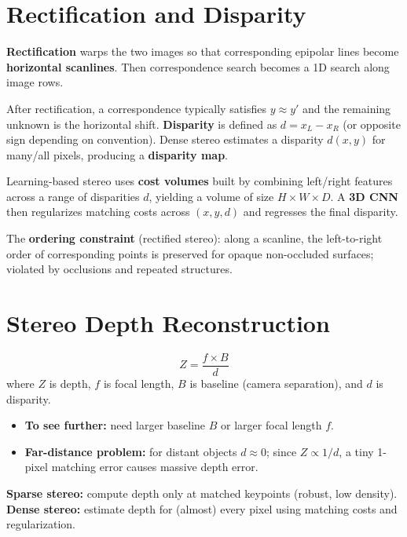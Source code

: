 \documentclass[11pt, oneside]{book}
\begin{document}
\section{Rectification and Disparity}

\begin{defbox}[title={Rectification}]
\textbf{Rectification} warps the two images so that corresponding epipolar lines become \textbf{horizontal scanlines}.
Then correspondence search becomes a 1D search along image rows.
\end{defbox}

After rectification, a correspondence typically satisfies $y \approx y'$ and the remaining unknown is the horizontal shift.
\textbf{Disparity} is defined as $d = x_L - x_R$ (or opposite sign depending on convention).
Dense stereo estimates a disparity $d(x,y)$ for many/all pixels, producing a \textbf{disparity map}.

Learning-based stereo uses \textbf{cost volumes} built by combining left/right features across a range of disparities $d$,
yielding a volume of size $H\times W\times D$. A \textbf{3D CNN} then regularizes matching costs across $(x,y,d)$
and regresses the final disparity.

The \textbf{ordering constraint} (rectified stereo): along a scanline, the left-to-right order of corresponding points
is preserved for opaque non-occluded surfaces; violated by occlusions and repeated structures.

\section{Stereo Depth Reconstruction}

\begin{thmbox}[title={The Classic Stereo Formula}]
\[
Z = \frac{f \times B}{d}
\]
where $Z$ is depth, $f$ is focal length, $B$ is baseline (camera separation), and $d$ is disparity.
\begin{itemize}
  \item \textbf{To see further:} need larger baseline $B$ or larger focal length $f$.
  \item \textbf{Far-distance problem:} for distant objects $d \approx 0$; since $Z \propto 1/d$, a tiny 1-pixel matching error causes massive depth error.
\end{itemize}
\end{thmbox}

\begin{defbox}[title={Sparse vs.\ Dense Stereo}]
\textbf{Sparse stereo:} compute depth only at matched keypoints (robust, low density).
\textbf{Dense stereo:} estimate depth for (almost) every pixel using matching costs and regularization.
\end{defbox}
\end{document}
